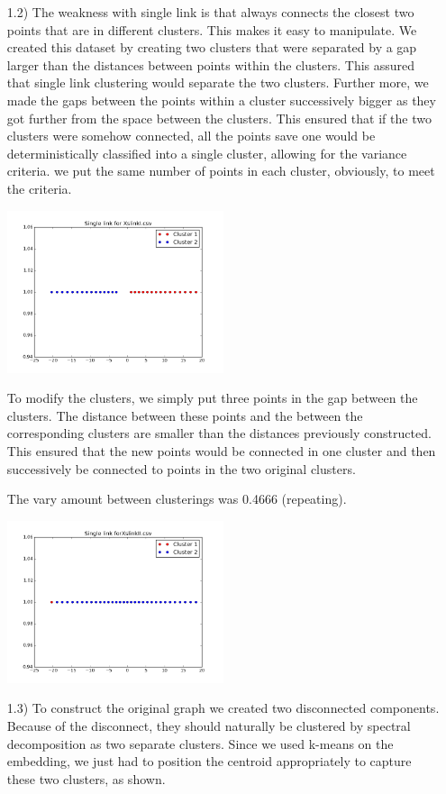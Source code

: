 \documentclass[12pt]{article}
\begin{document}
\begin{enumerate}
\item[1.2)] The weakness with single link is that always connects the closest two points that are in different clusters. This makes it easy to manipulate. We created this dataset by creating two clusters that were separated by a gap larger than the distances between points within the clusters. This assured that single link clustering would separate the two clusters. Further more, we made the gaps between the points within a cluster successively bigger as they got further from the space between the clusters. This ensured that if the two clusters were somehow connected, all the points save one would be deterministically classified into a single cluster, allowing for the variance criteria. we put the same number of points in each cluster, obviously, to meet the criteria.

\includegraphics[width=0.5\textwidth]{Single_link_for_XslinkI.png}

To modify the clusters, we simply put three points in the gap between the clusters. The distance between these points and the between the corresponding clusters are smaller than the distances previously constructed. This ensured that the new points would be connected in one cluster and then successively be connected to points in the two original clusters.

The vary amount between clusterings was 0.4666 (repeating).

\includegraphics[width=0.5\textwidth]{Single_link_forXslinkII.png}

\item[1.3)] To construct the original graph we created two disconnected components. Because of the disconnect, they should naturally be clustered by spectral decomposition as two separate clusters. Since we used k-means on the embedding, we just had to position the centroid appropriately to capture these two clusters, as shown. 


\end{enumerate}
\end{document}
